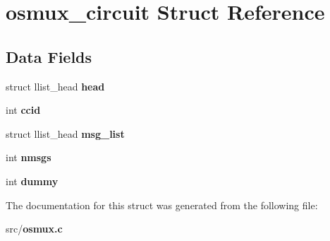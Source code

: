 \section{osmux\+\_\+circuit Struct Reference}
\label{structosmux__circuit}
\subsection*{Data Fields}
\begin{DoxyCompactItemize}
\item 
struct llist\+\_\+head {\bfseries head}\label{structosmux__circuit_a815dfd8ed9833224b9774cf8277402ca}

\item 
int {\bfseries ccid}\label{structosmux__circuit_a2cfac1921724ba15322226462517e92e}

\item 
struct llist\+\_\+head {\bfseries msg\+\_\+list}\label{structosmux__circuit_a996a9d51bd5bb358aafe208a5725978e}

\item 
int {\bfseries nmsgs}\label{structosmux__circuit_aa77e3a7965e6b2a20ecf25930fa24a97}

\item 
int {\bfseries dummy}\label{structosmux__circuit_a02ab8c79e4f705eeba71a77aa482d8cb}

\end{DoxyCompactItemize}


The documentation for this struct was generated from the following file\+:\begin{DoxyCompactItemize}
\item 
src/{\bf osmux.\+c}\end{DoxyCompactItemize}
